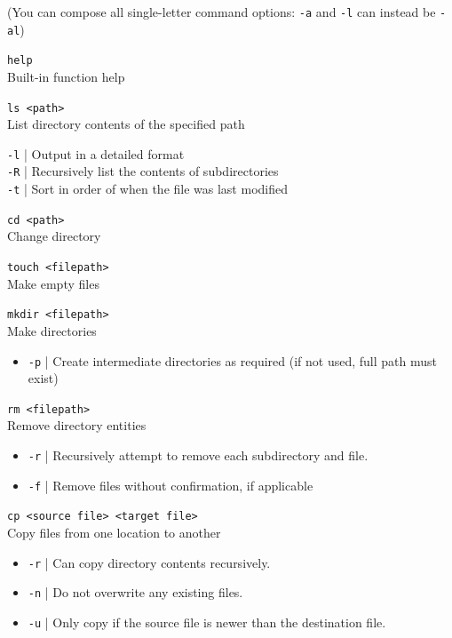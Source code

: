 \documentclass[a4paper,11pt,parskip=half-]{scrartcl}
\begin{document}
(You can compose all single-letter command options: \texttt{-a} and \texttt{-l} can instead be \texttt{-al})

\Large \texttt{help} \normalsize \\
Built-in function help

\Large \texttt{ls <path>} \normalsize \\
List directory contents of the specified path

\qquad \texttt{-l} | Output in a detailed format \\
\qquad \texttt{-R} | Recursively list the contents of subdirectories \\
\qquad \texttt{-t} | Sort in order of when the file was last modified

\Large \texttt{cd <path>} \normalsize \\
Change directory

\Large \texttt{touch <filepath>} \normalsize \\
Make empty files

\Large \texttt{mkdir <filepath>} \normalsize \\
Make directories
\begin{itemize}
    \item \texttt{-p} | Create intermediate directories as required (if not used, full path must exist)
\end{itemize}

\Large \texttt{rm <filepath>} \normalsize \\
Remove directory entities
\begin{itemize}
    \item \texttt{-r} | Recursively attempt to remove each subdirectory and file.
    \item \texttt{-f} | Remove files without confirmation, if applicable
\end{itemize}

\Large \texttt{cp <source file> <target file>} \normalsize \\
Copy files from one location to another
\begin{itemize}
    \item \texttt{-r} | Can copy directory contents recursively.
    \item \texttt{-n} | Do not overwrite any existing files.
    \item \texttt{-u} | Only copy if the source file is newer than the destination file.
\end{itemize}
\end{document}
